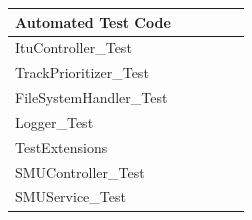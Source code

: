 \documentclass[a4paper,11pt,report]{article}
\begin{document}
\begin{figure}[htp]
\begin{tabular}{| l | l | l | l | l | l |}
  \hline
  \multicolumn{6}{|l|}{Automated Test Code} \\
  \hline
  ItuController\_Test &  & \cellcolor{Gray} &  & \cellcolor{Gray}  & \\
  \hline
  TrackPrioritizer\_Test & \cellcolor{Gray}  &  &  &  &  \\
  \hline
  FileSystemHandler\_Test &  &  &  & \cellcolor{Gray}  &  \\
  \hline
  Logger\_Test &  &  &  & \cellcolor{Gray}  &  \\
  \hline
  TestExtensions &  & \cellcolor{Gray}  &  & \cellcolor{Gray}  &  \\
  \hline
  SMUController\_Test &  & \cellcolor{Gray}  & \cellcolor{Gray}  &  & \cellcolor{Gray}  \\
  \hline
  SMUService\_Test & \cellcolor{Gray}  &  &  & \cellcolor{Gray}  &  \\
  \hline
\end{tabular}
\end{figure}
\end{document}
